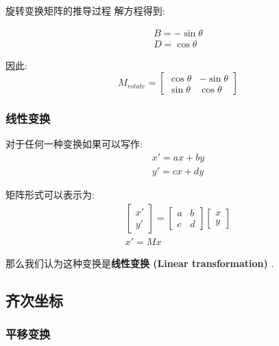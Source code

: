 \begin{titledbox}{旋转变换矩阵的推导过程}
解方程得到: 

\begin{equation}
	\begin{split}
		B=-\sin\theta\\D=\cos\theta
	\end{split}
\end{equation}

因此: 
\begin{equation}
	M_{rotate}=\begin{bmatrix}\cos\theta&-\sin\theta\\\sin\theta&\cos\theta\end{bmatrix}
\end{equation}

\end{titledbox}

\subsubsection{线性变换}

对于任何一种变换如果可以写作: 
\begin{equation}
	\begin{split}
		x'=ax+by\\y'=cx+dy
	\end{split}
\end{equation}

矩阵形式可以表示为: 
\begin{equation}
	\begin{split}
	\begin{bmatrix}x'\\y'\end{bmatrix}=\begin{bmatrix}a&b\\c&d\end{bmatrix}\begin{bmatrix}x\\y\end{bmatrix}
	\\
	x'=Mx
	\end{split}
\end{equation}

那么我们认为这种变换是\textbf{线性变换 (Linear transformation) }. 

\subsection{齐次坐标}

\subsubsection{平移变换}

